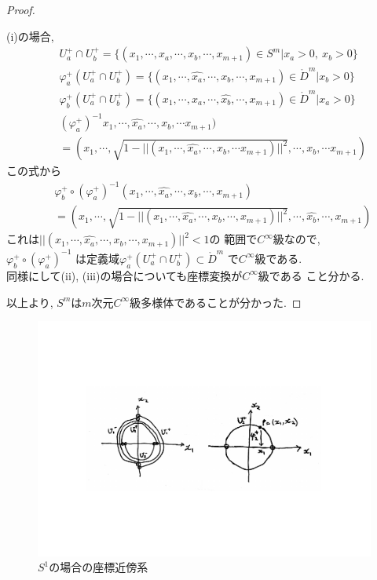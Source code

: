 \documentclass[a4j,12pt]{jarticle}
\theoremstyle{definition}
\begin{document}
\begin{proof}
\begin{itemize}
        (i)の場合, 
        \begin{eqnarray*}
            &&U_a^+\cap U_b^+ =\{(x_1,\cdots ,x_a,\cdots ,x_b,\cdots ,x_{m+1})\in S^m|x_a>0,\ x_b>0\}\\
            &&\varphi_a^+(U_a^+\cap U_b^+) =\{(x_1,\cdots ,\hat{x_a},\cdots ,x_b,\cdots ,x_{m+1})\in \mathring{D}^m|x_b>0\}\\
            &&\varphi_b^+(U_a^+\cap U_b^+) =\{(x_1,\cdots ,x_a,\cdots ,\hat{x_b},\cdots ,x_{m+1})\in \mathring{D}^m|x_a>0\}\\
            &&(\varphi_a^+)^{-1}x_1,\cdots ,\hat{x_a},\cdots ,x_b,\cdots x_{m+1})\\
            &&=(x_1,\cdots ,\sqrt{1-||(x_1,\cdots ,\hat{x_a},\cdots ,x_b,\cdots x_{m+1})||^2},\cdots ,x_b,\cdots x_{m+1})
        \end{eqnarray*}
        この式から
        \begin{eqnarray*}
        &&\varphi_b^+\circ(\varphi_a^+)^{-1}(x_1,\cdots ,\hat{x_a},\cdots ,x_b,\cdots ,x_{m+1})\\
        &&=(x_1,\cdots ,\sqrt{1-||(x_1,\cdots ,\hat{x_a},\cdots ,x_b,\cdots ,x_{m+1})||^2},\cdots ,\hat{x_b},\cdots ,x_{m+1})
        \end{eqnarray*}
        これは$||(x_1,\cdots ,\hat{x_a},\cdots ,x_b,\cdots ,x_{m+1})||^2<1$の
        範囲で$C^{\infty}$級なので, \\$\varphi_b^+\circ(\varphi_a^+)^{-1}$
        は定義域$\varphi_a^+(U_a^+\cap U_b^+)\subset \mathring{D}^m$
        で$C^{\infty}$級である. \\
        同様にして(ii), (iii)の場合についても座標変換が$C^{\infty}$級である
        こと分かる. \\
    \end{itemize}
    以上より, $S^m$は$m$次元$C^{\infty}$級多様体であることが分かった. 
\end{proof}
\begin{figure}[H]
    \centering
    \includegraphics[keepaspectratio, scale=0.6]{locaCoSysOfS1.pdf}
    \caption{$S^1$の場合の座標近傍系}
    \label{locaCoSysOfS1}
   \end{figure}
\end{document}
